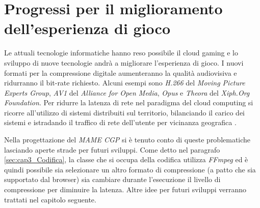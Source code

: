 \section{Progressi per il miglioramento dell'esperienza di gioco} \label{sec:cap4_ProgressiTech}
Le attuali tecnologie informatiche hanno reso possibile il cloud gaming e lo sviluppo di nuove tecnologie andrà a migliorare l'esperienza di gioco. I nuovi formati per la compressione digitale aumenteranno la qualità audiovisiva e ridurranno il bit-rate richiesto. Alcuni esempi sono \textit{H.266} del \textit{Moving Picture Experts Group}, \textit{AV1} del \textit{Alliance for Open Media}, \textit{Opus} e \textit{Theora} del \textit{Xiph.Org Foundation}. Per ridurre la latenza di rete nel paradigma del cloud computing si ricorre all'utilizzo di sistemi distribuiti sul territorio, bilanciando il carico dei sistemi e istradando il traffico di rete dell'utente per vicinanza geografica \parencite{sun_2019}.

Nella progettazione del \textit{MAME CGP} si è tenuto conto di queste problematiche lasciando aperte strade per futuri sviluppi. Come detto nel paragrafo \ref{sec:cap3_Codifica}, la classe che si occupa della codifica utilizza \textit{FFmpeg} ed è quindi possibile sia selezionare un altro formato di compressione (a patto che sia supportato dal browser) sia cambiare durante l'esecuzione il livello di compressione per diminuire la latenza. Altre idee per futuri sviluppi verranno trattati nel capitolo seguente.